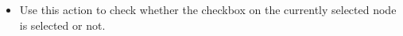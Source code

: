 
\begin{itemize}
\item Use this action to check whether the checkbox on the currently selected node is selected or not.
\end{itemize}
